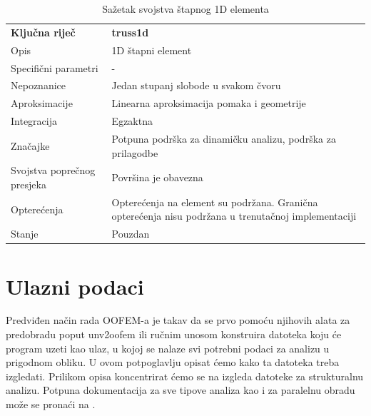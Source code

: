 \documentclass[a4paper,twoside,12pt]{memoir} %
\begin{document}
\begin{table}[h!]
\centering
\begin{tabular}{| m{9em} | m{25em}|} 
 \hline
 \textbf{Ključna riječ} & \textbf{truss1d} \\ [1ex]
 Opis & 1D štapni element \\
 Specifični parametri & - \\
 \hline
 Nepoznanice & Jedan stupanj slobode u svakom čvoru \\ 
 Aproksimacije & Linearna aproksimacija pomaka i geometrije \\
 Integracija & Egzaktna \\
 Značajke & Potpuna podrška za dinamičku analizu, podrška za prilagodbe \\
 Svojstva poprečnog presjeka & Površina je obavezna \\
 Opterećenja & Opterećenja na element su podržana. Granična opterećenja nisu podržana u trenutačnoj implementaciji\\
 Stanje & Pouzdan \\
 \hline
\end{tabular}
\caption{Sažetak svojstva štapnog 1D elementa}
\label{tab:svojstva_stapnog_elementa}
\end{table}


\section{Ulazni podaci}
\label{poglavlje:koristenje_oofema}
Predviđen način rada OOFEM-a je takav da se prvo pomoću njihovih alata za predobradu poput unv2oofem ili ručnim unosom konstruira datoteka koju će program uzeti kao ulaz, u kojoj se nalaze svi potrebni podaci za analizu u prigodnom obliku. U ovom potpoglavlju opisat ćemo kako ta datoteka treba izgledati. Prilikom opisa koncentrirat ćemo se na izgleda datoteke za strukturalnu analizu. Potpuna dokumentacija za sve tipove analiza kao i za paralelnu obradu može se pronaći na \cite{oofem-web}. \par
\end{document}
